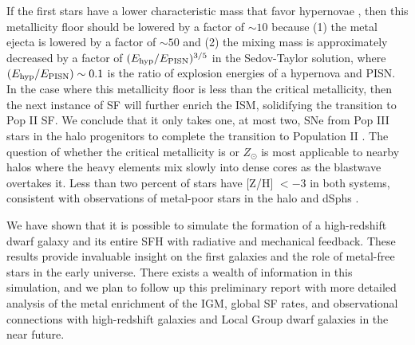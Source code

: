 \documentclass[apjl]{emulateapj}
\begin{document}
If the first stars have a lower characteristic mass that favor
hypernovae \citep{Tumlinson07_IMF}, then this metallicity floor should
be lowered by a factor of $\sim 10$ because (1) the metal ejecta is
lowered by a factor of $\sim 50$ and (2) the mixing mass is
approximately decreased by a factor of $(E_{\rm hyp}/E_{\rm
  PISN})^{3/5}$ in the Sedov-Taylor solution, where $(E_{\rm
  hyp}/E_{\rm PISN}) \sim 0.1$ is the ratio of explosion energies of a
hypernova and PISN.  In the case where this metallicity floor is less
than the critical metallicity, then the next instance of SF will
further enrich the ISM, solidifying the transition to Pop II SF.  We
conclude that it only takes one, at most two, SNe from Pop III stars
in the halo progenitors to complete the transition to Population II
\citep{Frebel10}.  The question of whether the critical metallicity is
 or  $Z_\odot$ is most applicable to nearby
halos where the heavy elements mix slowly into dense cores as the
blastwave overtakes it.  Less than two percent of stars have [Z/H] $<
-3$ in both systems, consistent with observations of metal-poor stars
in the halo and dSphs \citep{Beers05, Battaglia10}.


We have shown that it is possible to simulate the formation of a
high-redshift dwarf galaxy and its entire SFH with radiative and
mechanical feedback.  These results provide invaluable insight on the
first galaxies and the role of metal-free stars in the early universe.
There exists a wealth of information in this simulation, and we plan
to follow up this preliminary report with more detailed analysis of
the metal enrichment of the IGM, global SF rates, and observational
connections with high-redshift galaxies and Local Group dwarf galaxies
in the near future.
\end{document}
